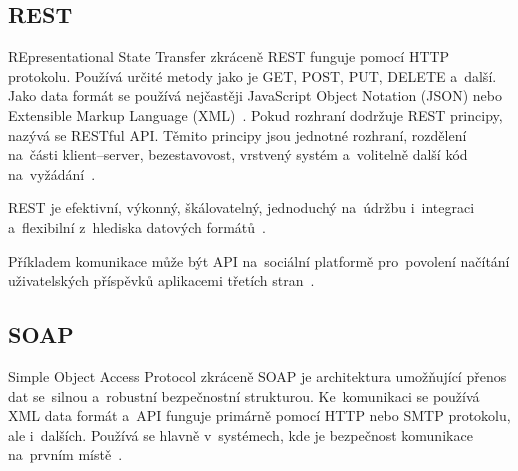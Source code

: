 \documentclass[twoside]{ctuthesis}
\begin{document}
\subsection{REST}

REpresentational State Transfer zkráceně REST funguje pomocí HTTP protokolu. Používá určité metody jako je GET, POST, PUT, DELETE a~další. Jako data formát se používá nejčastěji JavaScript Object Notation (JSON) nebo Extensible Markup Language (XML)~\cite{mediumapi}. Pokud rozhraní dodržuje REST principy, nazývá se RESTful API. Těmito principy jsou jednotné rozhraní, rozdělení na~části klient--server, bezestavovost, vrstvený systém a~volitelně další kód na~vyžádání~\cite{rest}.
%

REST je efektivní, výkonný, škálovatelný, jednoduchý na~údržbu i~integraci a~flexibilní z~hlediska datových formátů~\cite{mediumapi, milan}.

Příkladem komunikace může být API na~sociální platformě pro~povolení načítání uživatelských příspěvků aplikacemi třetích stran~\cite{milan}.

\subsection{SOAP}

Simple Object Access Protocol zkráceně SOAP je architektura umožňující přenos dat se~silnou a~robustní bezpečnostní strukturou. Ke~komunikaci se používá XML data formát a~API funguje primárně pomocí HTTP nebo SMTP protokolu, ale i~dalších. Používá se hlavně v~systémech, kde je bezpečnost komunikace na~prvním místě~\cite{mediumapi, milan}.
\end{document}
